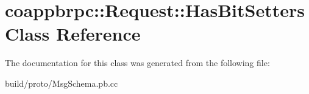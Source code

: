\hypertarget{classcoappbrpc_1_1Request_1_1HasBitSetters}{}\section{coappbrpc\+:\+:Request\+:\+:Has\+Bit\+Setters Class Reference}
\label{classcoappbrpc_1_1Request_1_1HasBitSetters}


The documentation for this class was generated from the following file\+:\begin{DoxyCompactItemize}
\item 
build/proto/Msg\+Schema.\+pb.\+cc\end{DoxyCompactItemize}
